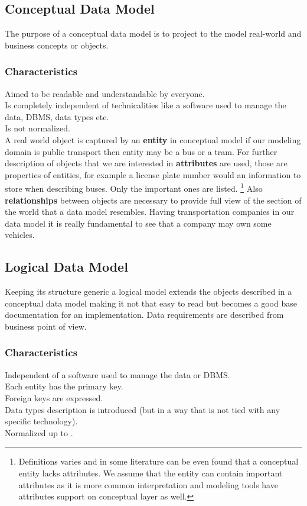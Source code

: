 \subsection{Conceptual Data Model}

The purpose of a conceptual data model is to project to the model real-world and business concepts or objects. \\

\subsubsection{Characteristics}
Aimed to be readable and understandable by everyone. \\
Is completely independent of technicalities like a software used to manage the data, DBMS, data types etc. \\
Is not normalized. \\

A real world object is captured by an \textbf{entity} in conceptual model if our modeling domain is public transport then entity may be a bus or a tram.
For further description of objects that we are interested in \textbf{attributes} are used, those are properties of entities, for example a license plate number would an information to store when describing buses. Only the important ones are listed. \footnote{Definitions varies and in some literature can be even found that a conceptual entity lacks attributes. We assume that the entity can contain important attributes as it is more common interpretation and modeling tools have attributes support on conceptual layer as well.}
Also \textbf{relationships} between objects are necessary to provide full view of the section of the world that a data model resembles. Having transportation companies in our data model it is really fundamental to see that a company may own some vehicles. \\

\subsection{Logical Data Model}

Keeping its structure generic a logical model extends the objects described in a conceptual data model making it not that easy to read but becomes a good base documentation for an implementation. Data requirements are described from business point of view.

\subsubsection{Characteristics}
Independent of a software used to manage the data or DBMS. \\
Each entity has the primary key. \\
Foreign keys are expressed. \\
Data types description is introduced (but in a way that is not tied with any specific technology). \\
Normalized up to . \\


